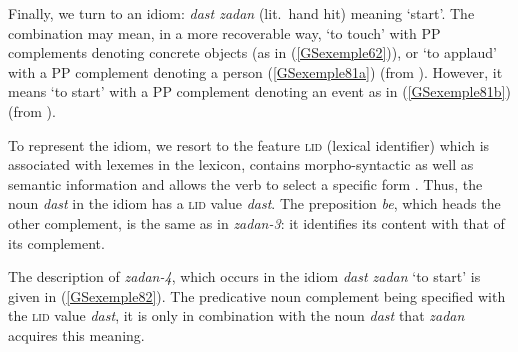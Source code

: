 {Finally, we turn to an idiom: \emph{dast zadan} (lit.\ hand hit) meaning `start'. The combination may mean, in a more recoverable way, `to touch' with PP complements denoting concrete objects (as in (\ref{GSexemple62})), or `to applaud' with a PP complement denoting a person (\ref{GSexemple81a}) (from \citealt[45]{pollet2012grammaire}). However, it means `to start' with a PP complement denoting an event as in (\ref{GSexemple81b}) (from \citealt[185]{pollet2012grammaire}).

\eal
	\label{GSexemple81} 
	\label{GSexemple81a}
		
    \label{GSexemple81b}
\zl

To represent the idiom, we resort to the feature \textsc{lid} (lexical identifier) which is associated with lexemes in the lexicon, contains morpho-syntactic as well as semantic information and allows the verb to select a specific form \citep{Sag2007a, Sag2012a}. Thus, the noun \emph{dast} in the idiom has a \textsc{lid} value \emph{dast}. The preposition \emph{be}, which heads the other complement, is the same as in \emph{zadan-3}: it identifies its content with that of its complement.

The description of \emph{zadan-4}, which occurs in the idiom \emph{dast zadan} `to start' is given in (\ref{GSexemple82}). The predicative noun complement being specified with the \textsc{lid} value \emph{dast}, it is only in combination with the noun \emph{dast} that \emph{zadan} acquires this meaning.


\begin{exe}
\end{exe}

}
